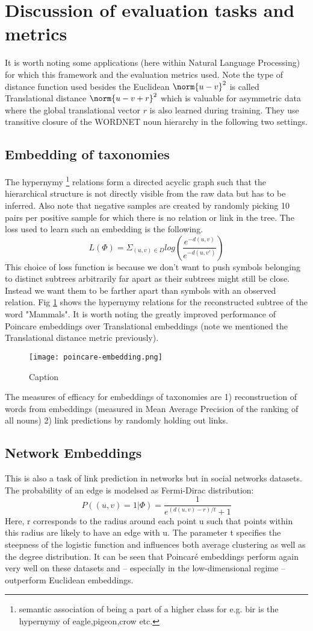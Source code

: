 \section{Discussion of evaluation tasks and metrics}
It is worth noting some applications (here within Natural Language Processing) for which this framework and the evaluation metrics used. Note the type of distance function used besides the Euclidean $\norm{u -v}^2$ is called Translational distance $\norm{u-v+r}^2$ which is valuable for asymmetric data where the global translational vector $r$ is also learned during training. They use transitive closure of the WORDNET noun hierarchy in the following two settings.
\subsection{Embedding of taxonomies}
The hypernymy \footnote{semantic association of being a part of a higher class for e.g. bir is the hypernymy of eagle,pigeon,crow etc.} relations form a directed acyclic graph such that the hierarchical structure is not directly visible from the raw data but has to be inferred. Also note that negative samples are created by randomly picking 10 pairs per positive sample for which there is no relation or link in the tree. The loss used to learn such an embedding is the following.
$$L(\Phi) = \Sigma_{(u,v)\in D} log (\frac{e^{-d(u,v)}}{e^{-d(u,v')}})$$
This choice of loss function is because we don’t want to push symbols belonging to distinct subtrees arbitrarily far apart as their subtrees might still be close. Instead we want them to be farther apart than symbols with an observed relation. Fig \ref{poincare-embedding} shows the hypernymy relations for the reconstructed subtree of the word "Mammals". It is worth noting the greatly improved performance of Poincare embeddings over Translational embeddings (note we mentioned the Translational distance metric previously).
\begin{figure}
    \centering
    \texttt{[image: poincare-embedding.png]}
    \caption{Caption}
    \label{poincare-embedding}
\end{figure}
The measures of efficacy for embeddings of taxonomies are 1) reconstruction of words from embeddings (measured in Mean Average Precision of the ranking of all nouns) 2) link predictions by randomly holding out links.
\subsection{Network Embeddings}
This is also a task of link prediction in networks but in social networks datasets.  The probability of an edge is modelsed as Fermi-Dirac distribution:
$$P((u,v) = 1 | \Phi)= \frac{1}{e^{(d(u,v)-r)/t}+1}$$
Here, r corresponds to the radius around each point u such that points within this radius are likely to have an edge with u. The parameter t specifies the steepness of the logistic function and influences both average clustering as well as the degree distribution. It can be seen that Poincar\'e embeddings perform again very well on these datasets and – especially in the low-dimensional regime – outperform Euclidean embeddings.
